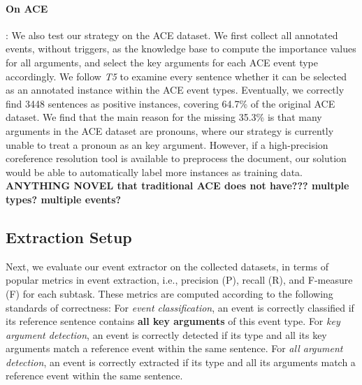 

\paragraph{On ACE}: We also test our strategy on the ACE dataset.
We first collect all annotated events, without triggers, as the knowledge base
to compute the importance values for all arguments, and select the key arguments
for each ACE event type accordingly.  We follow \textit{T5} to examine every sentence
whether it can be selected as an annotated instance within the ACE event types.
Eventually, we correctly find 3448 sentences as positive instances, covering
64.7\% of the original ACE dataset.  We find that the main reason for the
missing 35.3\% is that many arguments in the ACE dataset are pronouns,
where our strategy is currently unable to treat a pronoun as an key argument. However,
if a high-precision coreference resolution tool is available to preprocess the document,
our solution would be able to automatically label more instances as training data.
\textbf{ANYTHING NOVEL that traditional ACE does not have??? multple types? multiple events?}

 \subsection{Extraction Setup}\label{sec:evalevent}
Next, we evaluate our event extractor on the collected datasets,
in terms of popular metrics in event extraction, i.e., precision (P), recall (R), and F-measure (F) for each subtask. These metrics are computed according to the following standards of correctness:
For \emph{event classification}, an event is correctly classified if its reference sentence contains \textbf{all key arguments} of this event type.
For \emph{key argument detection}, an event is correctly detected if its type and all its key arguments match a reference event within the same sentence.
For \emph{all argument detection}, an event is correctly extracted if its type and all its arguments match a reference event within the same sentence.

